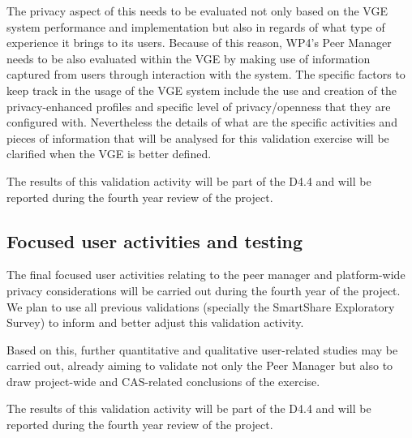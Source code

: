 The privacy aspect of this needs to be evaluated not only based on the VGE system performance and implementation but also in regards of what type of experience it brings to its users. Because of this reason, WP4's Peer Manager needs to be also evaluated within the VGE by making use of information captured from users through interaction with the system. The specific factors to keep track in the usage of the VGE system include the use and creation of the privacy-enhanced profiles and specific level of privacy/openness that they are configured with.  Nevertheless the details of what are the specific activities and pieces of information that will be analysed for this validation exercise will be clarified when the VGE is better defined. 

The results of this validation activity will be part of the D4.4 and will be reported during the fourth year review of the project.

\subsection{Focused user activities and testing}
The final focused user activities relating to the peer manager and platform-wide privacy considerations will be carried out during the fourth year of the project. We plan to use all previous validations (specially the SmartShare Exploratory Survey) to inform and better adjust this validation activity. 

Based on this, further quantitative and qualitative user-related studies may be carried out, already aiming to validate not only the Peer Manager but also to draw project-wide and CAS-related conclusions of the exercise. 

The results of this validation activity will be part of the D4.4 and will be reported during the fourth year review of the project.